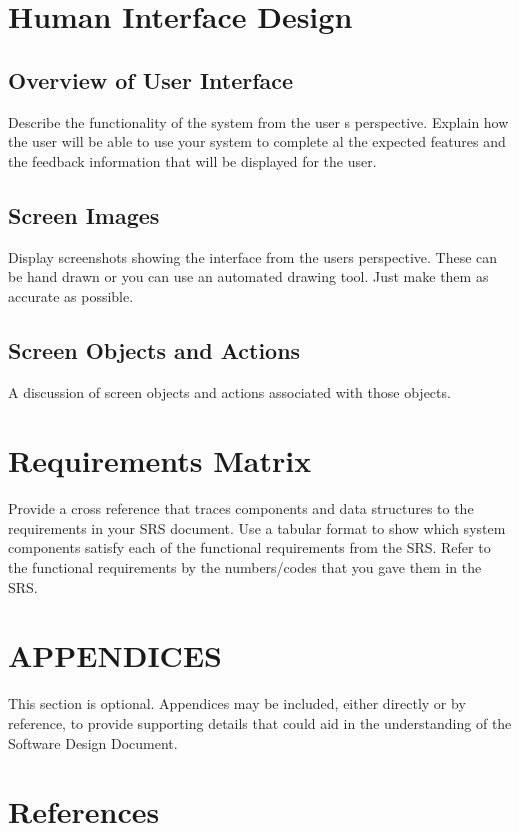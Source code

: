 \documentclass[12pt]{article}
\begin{document}
\section{Human Interface Design}

\subsection {Overview of User Interface}
Describe the functionality of the system from the user s perspective. Explain  how the user 
will be  able  to use  your system to complete  al the  expected  features and  the  feedback 
information that will be displayed for the user.

\subsection {Screen Images}
Display screenshots showing the interface from the users perspective. These can be  hand drawn
or you can use an automated drawing tool. Just make them as accurate as possible.



\subsection {Screen Objects and Actions}
A discussion of screen objects and actions associated with those objects.


\section{Requirements Matrix}
Provide a cross reference that traces components and data structures to the requirements in your
SRS document.
Use  a  tabular  format to show  which system  components satisfy each of the  functional 
requirements from the SRS. Refer to the functional requirements by the numbers/codes that you 
gave them in the SRS.


\section{APPENDICES}
This section is optional.
Appendices may be included, either directly or by reference, to provide supporting details that could 
aid in the understanding of the Software Design Document.

\section {References}



\end{document}
